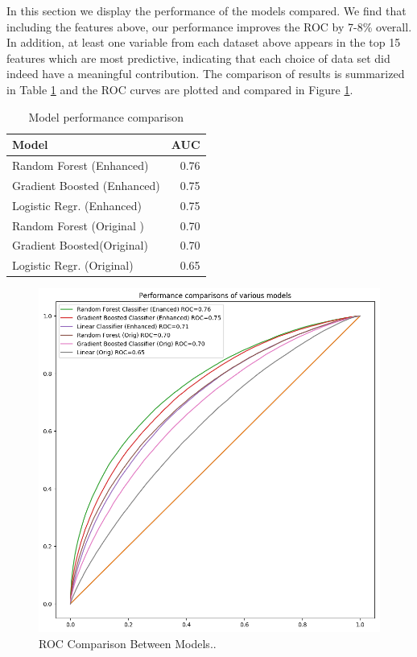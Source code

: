 \documentclass[twocolumn,showpacs,%
  nofootinbib,aps,superscriptaddress,%
  eqsecnum,prd,notitlepage,showkeys,10pt]{revtex4-1}
\begin{document}
In this section we display the performance of the models compared. We find that including the features above, our performance improves the ROC by 7-8\% overall. In addition, at least one variable from each dataset above appears in the top 15
features which are most predictive, indicating that each choice of data set did indeed have a meaningful contribution. The comparison of results is summarized in Table \ref{tab:widgets} and the ROC curves are plotted and compared in Figure \ref{fig:ROC}.

\begin{table}
\centering
\begin{tabular}{l|r}
Model & AUC\\\hline
Random Forest (Enhanced) & 0.76 \\
Gradient Boosted (Enhanced) & 0.75 \\
Logistic Regr. (Enhanced) & 0.75\\
Random Forest (Original )& 0.70 \\
Gradient Boosted(Original) & 0.70 \\
Logistic Regr. (Original) & 0.65
\end{tabular}
\caption{\label{tab:widgets}Model performance comparison}
\end{table}


\begin{figure}
\includegraphics[scale=0.35]{roc_final}
\caption{\label{fig:ROC}ROC Comparison Between Models..}
\end{figure}
\end{document}
